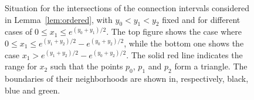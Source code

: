 \begin{figure}[!t]
\caption{Situation for the intersections of the connection intervals considered in Lemma~\ref{lem:ordered}, with $y_0 < y_1 <y_2$ fixed and for different cases of $0 \le x_1 \le e^{(y_0 + y_1)/2}$. The top figure shows the case where $0 \le x_1 \le e^{(y_1 + y_2)/2} - e^{(y_0 + y_2)/2}$, while the bottom one shows the case $x_1 > e^{(y_1 + y_2)/2} - e^{(y_0 + y_2)/2}$. The solid red line indicates the range for $x_2$ such that the points $p_0$, $p_1$ and $p_2$ form a triangle. The boundaries of their neighborhoods are shown in, respectively, black, blue and green.}
\label{fig:triangle_prob_lemma}
\end{figure}

